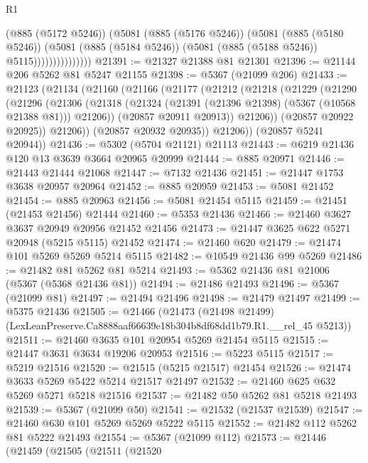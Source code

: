 \begin{lexlean}{R1}
\begin{coremodule}
                          (@885 (@5172 @5246))
                          (@5081
                            (@885 (@5176 @5246))
                            (@5081
                              (@885 (@5180 @5246))
                              (@5081
                                (@885 (@5184 @5246))
                                (@5081 (@885 (@5188 @5246)) @5115)))))))))))))))
@21391 := @21327 @21388 @81 @21301
@21396 := @21144 @206 @5262 @81 @5247 @21155
@21398 := @5367 (@21099 @206)
@21433 := @21123
    (@21134
      (@21160
        (@21166
          (@21177
            (@21212
              (@21218
                (@21229
                  (@21290
                    (@21296
                      (@21306
                        (@21318
                          (@21324 (@21391 (@21396 @21398) (@5367 (@10568 @21388 @81))) @21206))
                        (@20857 @20911 @20913))
                      @21206))
                  (@20857 @20922 @20925))
                @21206))
            (@20857 @20932 @20935))
          @21206))
      (@20857 @5241 @20944))
@21436 := @5302 (@5704 @21121) @21113
@21443 := @6219 @21436 @120 @13 @3639 @3664 @20965 @20999
@21444 := @885 @20971
@21446 := @21443 @21444 @21068
@21447 := @7132 @21436
@21451 := @21447 @1753 @3638 @20957 @20964
@21452 := @885 @20959
@21453 := @5081 @21452
@21454 := @885 @20963
@21456 := @5081 @21454 @5115
@21459 := @21451 (@21453 @21456) @21444
@21460 := @5353 @21436
@21466 := @21460 @3627 @3637 @20949 @20956 @21452 @21456
@21473 := @21447 @3625 @622 @5271 @20948 (@5215 @5115) @21452
@21474 := @21460 @620
@21479 := @21474 @101 @5269 @5269 @5214 @5115
@21482 := @10549 @21436 @99 @5269
@21486 := @21482 @81 @5262 @81 @5214
@21493 := @5362 @21436 @81 @21006 (@5367 (@5368 @21436 @81))
@21494 := @21486 @21493
@21496 := @5367 (@21099 @81)
@21497 := @21494 @21496
@21498 := @21479 @21497
@21499 := @5375 @21436
@21505 := @21466
    (@21473 (@21498 @21499) (LexLeanPreserve.Ca8888aaf66639e18b304b8df68dd1b79.R1.__rel_45 @5213))
@21511 := @21460 @3635 @101 @20954 @5269 @21454 @5115
@21515 := @21447 @3631 @3634 @19206 @20953
@21516 := @5223 @5115
@21517 := @5219 @21516
@21520 := @21515 (@5215 @21517) @21454
@21526 := @21474 @3633 @5269 @5422 @5214 @21517 @21497
@21532 := @21460 @625 @632 @5269 @5271 @5218 @21516
@21537 := @21482 @50 @5262 @81 @5218 @21493
@21539 := @5367 (@21099 @50)
@21541 := @21532 (@21537 @21539)
@21547 := @21460 @630 @101 @5269 @5269 @5222 @5115
@21552 := @21482 @112 @5262 @81 @5222 @21493
@21554 := @5367 (@21099 @112)
@21573 := @21446
    (@21459
      (@21505
        (@21511
          (@21520

\end{coremodule}
\end{lexlean}
